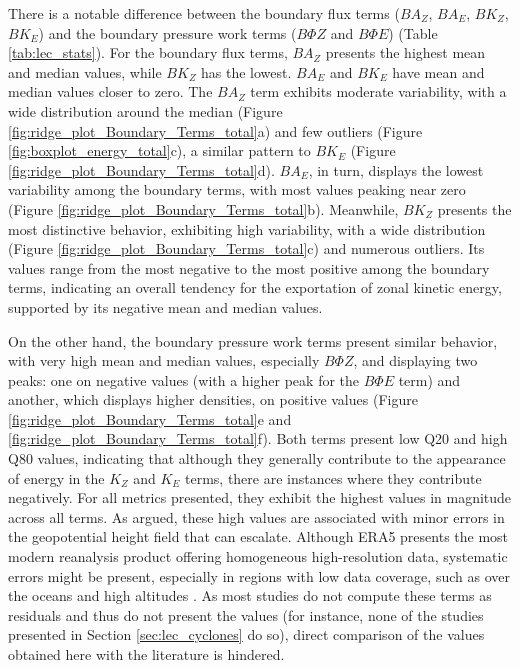 There is a notable difference between the boundary flux terms ($BA_Z$, $BA_E$, $BK_Z$, $BK_E$) and the boundary pressure work terms ($B\Phi Z$ and $B\Phi E$) (Table \ref{tab:lec_stats}). For the boundary flux terms, $BA_Z$ presents the highest mean and median values, while $BK_Z$ has the lowest. $BA_E$ and $BK_E$ have mean and median values closer to zero. The $BA_Z$ term exhibits moderate variability, with a wide distribution around the median (Figure \ref{fig:ridge_plot_Boundary_Terms_total}a) and few outliers (Figure \ref{fig:boxplot_energy_total}c), a similar pattern to $BK_E$ (Figure \ref{fig:ridge_plot_Boundary_Terms_total}d). $BA_E$, in turn, displays the lowest variability among the boundary terms, with most values peaking near zero (Figure \ref{fig:ridge_plot_Boundary_Terms_total}b). Meanwhile, $BK_Z$ presents the most distinctive behavior, exhibiting high variability, with a wide distribution (Figure \ref{fig:ridge_plot_Boundary_Terms_total}c) and numerous outliers. Its values range from the most negative to the most positive among the boundary terms, indicating an overall tendency for the exportation of zonal kinetic energy, supported by its negative mean and median values.

On the other hand, the boundary pressure work terms present similar behavior, with very high mean and median values, especially $B\Phi Z$, and displaying two peaks: one on negative values (with a higher peak for the $B\Phi E$ term) and another, which displays higher densities, on positive values (Figure \ref{fig:ridge_plot_Boundary_Terms_total}e and \ref{fig:ridge_plot_Boundary_Terms_total}f). Both terms present low Q20 and high Q80 values, indicating that although they generally contribute to the appearance of energy in the $K_Z$ and $K_E$ terms, there are instances where they contribute negatively. For all metrics presented, they exhibit the highest values in magnitude across all terms. As \citet{brennan1980zonal} argued, these high values are associated with minor errors in the geopotential height field that can escalate. Although ERA5 presents the most modern reanalysis product offering homogeneous high-resolution data, systematic errors might be present, especially in regions with low data coverage, such as over the oceans and high altitudes \citep{hersbach2020era5}. As most studies do not compute these terms as residuals and thus do not present the values (for instance, none of the studies presented in Section \ref{sec:lec_cyclones} do so), direct comparison of the values obtained here with the literature is hindered.

